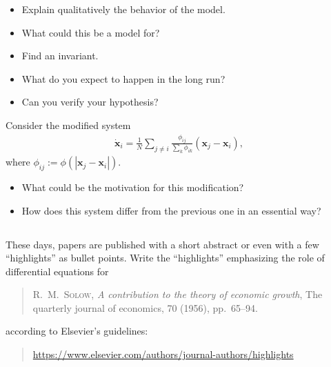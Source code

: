 \documentclass[12pt,a4paper]{article}
\begin{document}
    \begin{itemize}
    \item 
        Explain qualitatively the behavior of the model.
    \item
        What could this be a model for?
    \item
        Find an invariant.
    \item
        What do you expect to happen in the long run?
    \item
        Can you verify your hypothesis?
    \end{itemize}
    
    Consider the modified system 
    \begin{align}
        \dot{\mathbf{x}}_i
        =
        \frac{1}{N}
        \sum_{j \neq i}
        \frac{ \phi_{i j} }{ \sum_k \phi_{i k} }
        ( \mathbf{x}_j - \mathbf{x}_i )
        ,
    \end{align}
    where $\phi_{i j} := \phi(| \mathbf{x}_j - \mathbf{x}_i |)$.
    
    \begin{itemize}
    \item 
        What could be the motivation for this modification?
    \item
        How does this system differ from the previous one in an essential way?
    \end{itemize}

    

    

    

    
    \subsection{}
    
    These days, papers are published with a short abstract
    or even with a few ``highlights'' as bullet points. 
    Write the ``highlights''
    emphasizing the role of differential equations for 
    \begin{quote}
        \textsc{R.~M.~Solow},
        \emph{A contribution to the theory of economic growth},
        The quarterly journal of economics, 70 (1956), pp.~65--94.
    \end{quote}
    according to Elsevier's guidelines: 
    \begin{quote}
        {\small\url{https://www.elsevier.com/authors/journal-authors/highlights}}
    \end{quote}
    
\end{document}
